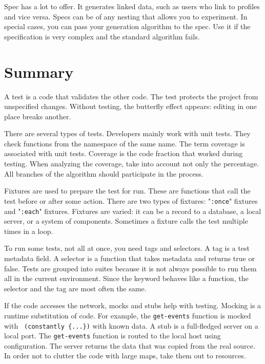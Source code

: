 \fi

Spec has a lot to offer. It generates linked data, such as users who link to profiles and vice versa. Specs can be of any nesting that allows you to experiment. In special cases, you can pass your generation algorithm to the spec. Use it if the specification is very complex and the standard algorithm fails.

\section{ Summary }

A test is a code that validates the other code. The test protects the project from unspecified changes. Without testing, the butterfly effect appears: editing in one place breaks another.


There are several types of tests. Developers mainly work with unit tests. They check functions from the namespace of the same name. The term coverage is associated with unit tests. Coverage is the code fraction that worked during testing. When analyzing the coverage, take into account not only the percentage. All branches of the algorithm should participate in the process.

Fixtures are used to prepare the test for run. These are functions that call the test before or after some action. There are two types of fixtures: "\verb|:once|" fixtures and "\verb|:each|" fixtures. Fixtures are varied: it can be a record to a database, a local server, or a system of components. Sometimes a fixture calls the test multiple times in a loop.

To run some tests, not all at once, you need tags and selectors. A tag is a test metadata field. A selector is a function that takes metadata and returns true or false. Tests are grouped into suites because it is not always possible to run them all in the current environment. Since the keyword behaves like a function, the selector and the tag are most often the same.

If the code accesses the network, mocks and stubs help with testing. Mocking is a runtime substitution of code. For example, the \verb|get-events| function is mocked with \verb| (constantly {...})| with known data. A stub is a full-fledged server on a local port. The \verb|get-events| function is routed to the local host using configuration. The server returns the data that was copied from the real source. In order not to clutter the code with large maps, take them out to resources.


